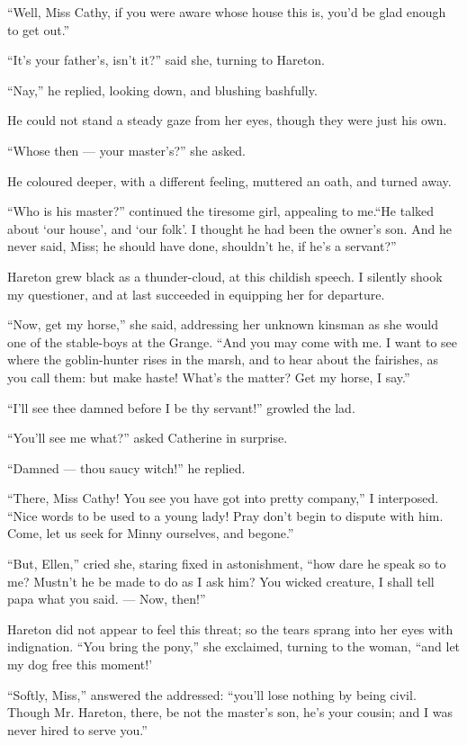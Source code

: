 \par “Well, Miss Cathy, if you were aware whose house this is, you'd be glad enough to get out.”
\par “It's your father's, isn't it?” said she, turning to Hareton.
\par “Nay,” he replied, looking down, and blushing bashfully.
\par He could not stand a steady gaze from her eyes, though they were just his own.
\par “Whose then — your master's?” she asked.
\par He coloured deeper, with a different feeling, muttered an oath, and turned away.
\par “Who is his master?” continued the tiresome girl, appealing to me.“He talked about ‘our house', and ‘our folk'. I thought he had been the owner's son. And he never said, Miss; he should have done, shouldn't he, if he's a servant?”
\par Hareton grew black as a thunder-cloud, at this childish speech. I silently shook my questioner, and at last succeeded in equipping her for departure.
\par “Now, get my horse,” she said, addressing her unknown kinsman as she would one of the stable-boys at the Grange. “And you may come with me. I want to see where the goblin-hunter rises in the marsh, and to hear about the fairishes, as you call them: but make haste! What's the matter? Get my horse, I say.”
\par “I'll see thee damned before I be thy servant!” growled the lad.
\par “You'll see me what?” asked Catherine in surprise.
\par “Damned — thou saucy witch!” he replied.
\par “There, Miss Cathy! You see you have got into pretty company,” I interposed. “Nice words to be used to a young lady! Pray don't begin to dispute with him. Come, let us seek for Minny ourselves, and begone.”
\par “But, Ellen,” cried she, staring fixed in astonishment, “how dare he speak so to me? Mustn't he be made to do as I ask him? You wicked creature, I shall tell papa what you said. — Now, then!”
\par Hareton did not appear to feel this threat; so the tears sprang into her eyes with indignation. “You bring the pony,” she exclaimed, turning to the woman, “and let my dog free this moment!’
\par “Softly, Miss,” answered the addressed: “you'll lose nothing by being civil. Though Mr. Hareton, there, be not the master's son, he's your cousin; and I was never hired to serve you.”
